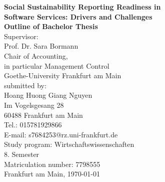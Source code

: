 \begin{titlepage}
    \begin{center}
        \vspace*{2cm}
        {\LARGE \textbf{Social Sustainability Reporting Readiness in \\[0.1cm] Software Services: Drivers and Challenges}}\\[1.7cm]
        {\Large \textbf{Outline of Bachelor Thesis}}\\[1.7cm]

        Supervisor:\\[0.5cm]
        Prof. Dr. Sara Bormann\\
        Chair of Accounting,\\
        in particular Management Control\\
        Goethe-University Frankfurt am Main\\[1.7cm]

        submitted by:\\[0.5cm]
        {Hoang Huong Giang Nguyen}\\
        {Im Vogelsgesang 28}\\
        {60488 Frankfurt am Main}\\
        Tel.: {015781929866}\\
        E-mail: {s7684253@rz.uni-frankfurt.de}\\
        Study program: {Wirtschaftswissenschaften}\\
        {8. Semester}\\
        Matriculation number: {7798555}\\[1.7cm]

        Frankfurt am Main, \today
    \end{center}
\end{titlepage}